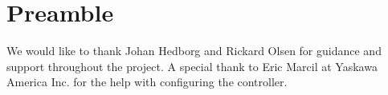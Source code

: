 
\section*{Preamble}

We would like to thank Johan Hedborg and Rickard Olsen for guidance and support throughout the project. A special thank to Eric Marcil at Yaskawa America Inc. for the help with configuring the controller. 
